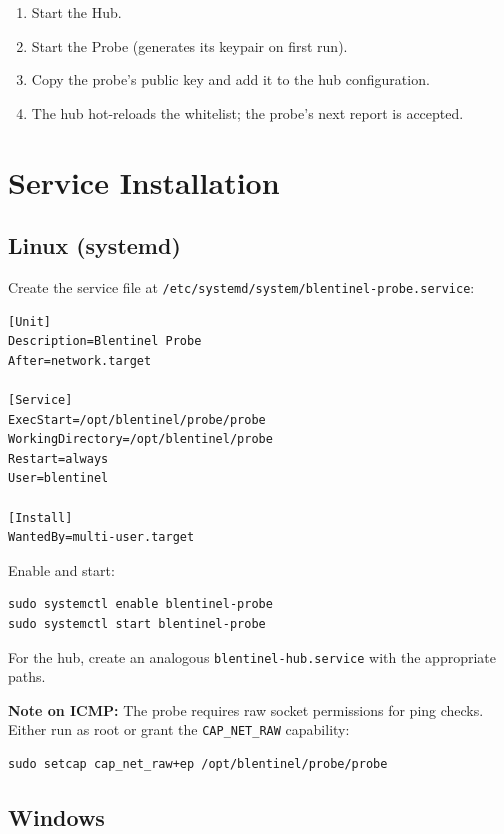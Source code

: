 \documentclass[12pt]{report}
\begin{document}
\begin{enumerate}
    \item Start the Hub.
    \item Start the Probe (generates its keypair on first run).
    \item Copy the probe's public key and add it to the hub configuration.
    \item The hub hot-reloads the whitelist; the probe's next report is
          accepted.
\end{enumerate}

\section{Service Installation}

\subsection{Linux (systemd)}

Create the service file at
\texttt{/etc/systemd/system/blentinel-probe.service}:

\begin{lstlisting}
[Unit]
Description=Blentinel Probe
After=network.target

[Service]
ExecStart=/opt/blentinel/probe/probe
WorkingDirectory=/opt/blentinel/probe
Restart=always
User=blentinel

[Install]
WantedBy=multi-user.target
\end{lstlisting}

Enable and start:

\begin{lstlisting}
sudo systemctl enable blentinel-probe
sudo systemctl start blentinel-probe
\end{lstlisting}

For the hub, create an analogous \texttt{blentinel-hub.service} with the
appropriate paths.

\textbf{Note on ICMP:} The probe requires raw socket permissions for ping
checks. Either run as root or grant the \texttt{CAP\_NET\_RAW} capability:

\begin{lstlisting}
sudo setcap cap_net_raw+ep /opt/blentinel/probe/probe
\end{lstlisting}

\subsection{Windows}
\end{document}
